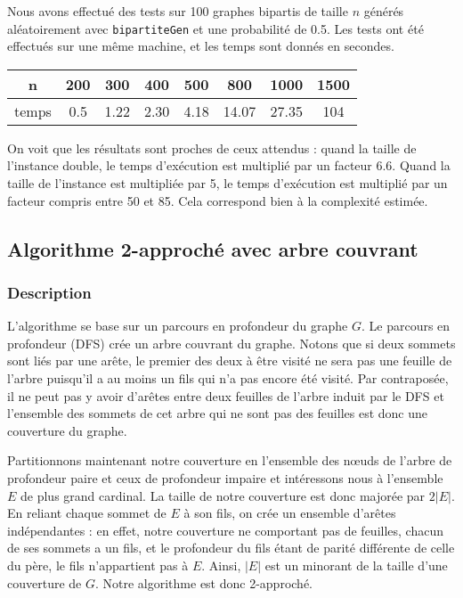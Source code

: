 \documentclass[a4paper,10pt]{article}
\begin{document}
Nous avons effectué des tests sur 100 graphes bipartis de taille $n$ générés aléatoirement avec \texttt{bipartiteGen} et une probabilité de 0.5. Les tests ont été effectués sur une même machine, et les temps sont donnés en secondes.

\begin{center}
\begin{tabular}{|c|c|c|c|c|c|c|c|}
	\hline 
	n & 200 & 300 & 400 & 500 & 800 & 1000 & 1500 \\
	\hline
	temps & 0.5 & 1.22 & 2.30 & 4.18 & 14.07 & 27.35 & 104 \\
	\hline
\end{tabular}
\end{center}

On voit que les résultats sont proches de ceux attendus : quand la taille de l'instance double, le temps d'exécution est multiplié par un facteur 6.6. Quand la taille de l'instance est multipliée par 5, le temps d'exécution est multiplié par un facteur compris entre 50 et 85. Cela correspond bien à la complexité estimée.

\subsection{Algorithme 2-approché avec arbre couvrant}

\subsubsection{Description}

L'algorithme se base sur un parcours en profondeur du graphe $G$. Le parcours en profondeur (DFS) crée un arbre couvrant du graphe. Notons que si deux sommets sont liés par une arête, le premier des deux à être visité ne sera pas une feuille de l'arbre puisqu'il a au moins un fils qui n'a pas encore été visité. Par contraposée, il ne peut pas y avoir d'arêtes entre deux feuilles de l'arbre induit par le DFS et l'ensemble des sommets de cet arbre qui ne sont pas des feuilles est donc une couverture du graphe. 

Partitionnons maintenant notre couverture en l'ensemble des nœuds de l'arbre de profondeur paire et ceux de profondeur impaire et intéressons nous à l'ensemble $E$ de plus grand cardinal. La taille de notre couverture est donc majorée par $2|E|$. En reliant chaque sommet de $E$ à son fils, on crée un ensemble d'arêtes indépendantes : en effet, notre couverture ne comportant pas de feuilles, chacun de ses sommets a un fils, et le profondeur du fils étant de parité différente de celle du père, le fils n'appartient pas à $E$. Ainsi, $|E|$ est un minorant de la taille d'une couverture de $G$. Notre algorithme est donc 2-approché.
\end{document}
